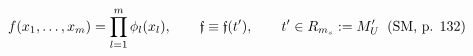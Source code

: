 \documentclass[preview]{standalone}
\begin{document}
\begin{align*}
\special{dvisvgm:raw <g id='unique000'>}f(x_1,\dots,x_m) = \prod_{l=1}^m \phi_l(x_l), \qquad \mathfrak{f} \equiv \mathfrak{f}(t'), \qquad t' \in R_{m_s} := M'_U\;\;(\text{SM, p. 132})\special{dvisvgm:raw </g>}
\end{align*}
\end{document}
